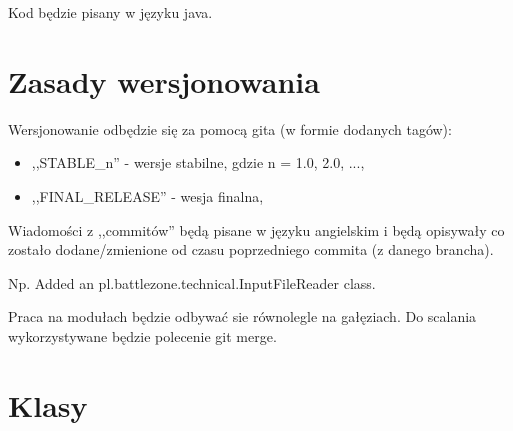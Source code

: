 \documentclass{article}
\begin{document}
Kod będzie pisany w języku java.

\section{Zasady wersjonowania}

Wersjonowanie odbędzie się za pomocą gita (w formie dodanych tagów):

\begin{itemize}
\item
,,STABLE\_n'' - wersje stabilne, gdzie n = 1.0, 2.0, ...,
\item
,,FINAL\_RELEASE'' - wesja finalna,
\end{itemize} 


Wiadomości z ,,commitów'' będą pisane w języku angielskim i będą opisywały co zostało dodane/zmienione od czasu poprzedniego commita (z danego brancha).

Np. Added an pl.battlezone.technical.InputFileReader class.

Praca na modułach będzie odbywać sie równolegle na gałęziach. Do scalania wykorzystywane będzie polecenie git merge.


\section{Klasy}
\end{document}
